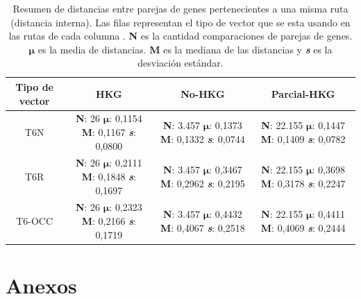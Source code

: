 \documentclass[12pt]{article}
\begin{document}
\begin{table}[ht!]
    \centering
    \begin{tabular}{|c|c|c|c|} %
        \hline %
        \textbf{Tipo de vector} & \textbf{HKG} & \textbf{No-HKG} & \textbf{Parcial-HKG} \\ \hline 
        T6N & \makecell{\textbf{N}: 26 $\boldsymbol\mu$: 0,1154 \\ \textbf{M}: 0,1167 \textbf{\emph{s}}: 0,0800 } &
        \makecell{\textbf{N}: 3.457 $\boldsymbol\mu$: 0,1373 \\ \textbf{M}: 0,1332 \textbf{\emph{s}}: 0,0744 } &
        \makecell{\textbf{N}: 22.155 $\boldsymbol\mu$: 0,1447 \\ \textbf{M}: 0,1409 \textbf{\emph{s}}: 0,0782 } \\ \hline
        T6R & \makecell{\textbf{N}: 26 $\boldsymbol\mu$: 0,2111 \\ \textbf{M}: 0,1848 \textbf{\emph{s}}: 0,1697 } &
        \makecell{\textbf{N}: 3.457 $\boldsymbol\mu$: 0,3467 \\ \textbf{M}: 0,2962 \textbf{\emph{s}}: 0,2195 } &
        \makecell{\textbf{N}: 22.155 $\boldsymbol\mu$: 0,3698 \\ \textbf{M}: 0,3178 \textbf{\emph{s}}: 0,2247 }\\ \hline
        T6-OCC & \makecell{\textbf{N}: 26 $\boldsymbol\mu$: 0,2323 \\ \textbf{M}: 0,2166 \textbf{\emph{s}}: 0,1719 } &
        \makecell{\textbf{N}: 3.457 $\boldsymbol\mu$: 0,4432 \\ \textbf{M}: 0,4067 \textbf{\emph{s}}: 0,2518 } &
        \makecell{\textbf{N}: 22.155 $\boldsymbol\mu$: 0,4411 \\ \textbf{M}: 0,4069 \textbf{\emph{s}}: 0,2444 } \\ \hline

    \end{tabular}
    \caption{Resumen de distancias entre parejas de genes pertenecientes a una misma ruta (distancia interna). Las filas representan el tipo de vector que se esta usando en las rutas de cada columna . \textbf{N} es la cantidad comparaciones de parejas de genes. $\boldsymbol\mu$ es la media de distancias. \textbf{M} es la mediana de las distancias y \textbf{\emph{s}} es la desviación estándar.}
    \label{res1}
\end{table}
\clearpage 
\section{Anexos}
\end{document}
